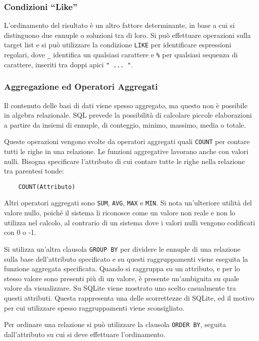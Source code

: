 \documentclass{article}
\numberwithin{equation}{subsection}
\begin{document}
\subsubsection{Condizioni ``Like''}

L'ordinamento del risultato è un altro fattore determinante, in base a cui si distinguono due ennuple 
o soluzioni tra di loro. Si può effettuare operazioni sulla target list e si può utilizzare la condizione \verb|LIKE| per identificare espressioni regolari, dove 
\verb|_| identifica un qualsiasi carattere e \verb|%| per qualsiasi sequenza di carattere, inseriti tra doppi apici \verb|" ... "|. 

\subsubsection{Aggregazione ed Operatori Aggregati}

Il contenuto delle basi di dati viene spesso aggregato, ma questo non è possibile in algebra relazionale. SQL prevede la possibilità di calcolare piccole elaborazioni 
a partire da insiemi di ennuple, di conteggio, minimo, massimo, media o totale. 

Queste operazioni vengono svolte da operatori aggregati quali \verb|COUNT| per contare tutti le righe in una relazione. Le funzioni aggregative 
lavorano anche con valori nulli. Bisogna specificare l'attributo di cui contare tutte le righe nella relazione tra parentesi tonde:
\begin{verbatim}
    COUNT(Attributo)
\end{verbatim}
Altri operatori aggregati sono \verb|SUM|, \verb|AVG|, \verb|MAX| e \verb|MIN|. Si nota un'ulteriore utilità del valore nullo, poiché il sistema li 
riconosce come un valore non reale e non lo utilizza nel calcolo, al contrario di un sistema dove i valori nulli vengono codificati con 0 o -1. 

Si utilizza un'altra clausola \verb|GROUP BY| per dividere le ennuple di una relazione sulla base dell'attributo specificato e su questi raggruppamenti viene eseguita la funzione 
aggregata specificata. Quando si raggruppa su un attributo, e per lo stesso valore sono presenti più di un valore, è presente un'ambiguita su quale valore da visualizzare. Su SQLite viene mostrato uno scelto 
casualmente tra questi attributi. Questa rappresenta una delle scorrettezze di SQLite, ed il motivo per cui utilizzare spesso raggruppamenti viene sconsigliato. 

Per ordinare una relazione si può utilizzare la clausola \verb|ORDER BY|, seguita dall'attributo su cui si deve effettuare l'ordinamento. 
\end{document}
